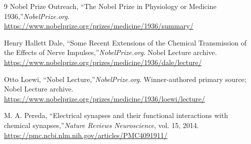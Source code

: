 \begin{thebibliography}{9}
Nobel Prize Outreach, ``The Nobel Prize in Physiology or Medicine 1936,''\emph{NobelPrize.org}.\newline
\url{https://www.nobelprize.org/prizes/medicine/1936/summary/}

Henry Hallett Dale, ``Some Recent Extensions of the Chemical Transmission of the Effects of Nerve Impulses,''\emph{NobelPrize.org}. Nobel Lecture archive.\newline
\url{https://www.nobelprize.org/prizes/medicine/1936/dale/lecture/}

Otto Loewi, ``Nobel Lecture,''\emph{NobelPrize.org}. Winner-authored primary source; Nobel Lecture archive.\newline
\url{https://www.nobelprize.org/prizes/medicine/1936/loewi/lecture/}

M. A. Pereda, ``Electrical synapses and their functional interactions with chemical synapses,''\emph{Nature Reviews Neuroscience}, vol. 15, 2014.\newline
\url{https://pmc.ncbi.nlm.nih.gov/articles/PMC4091911/}
\end{thebibliography}
